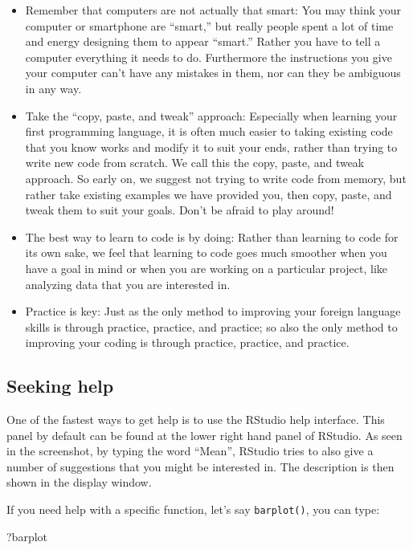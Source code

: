 \documentclass[
]{book}
\newenvironment{Shaded}{\begin{snugshade}}{\end{snugshade}}
\newcommand{\NormalTok}[1]{#1}
\providecommand{\tightlist}{%
  \setlength{\itemsep}{0pt}\setlength{\parskip}{0pt}}
\begin{document}
\begin{itemize}
\tightlist
\item
  Remember that computers are not actually that smart: You may think your computer or smartphone are ``smart,'' but really people spent a lot of time and energy designing them to appear ``smart.'' Rather you have to tell a computer everything it needs to do. Furthermore the instructions you give your computer can't have any mistakes in them, nor can they be ambiguous in any way.
\item
  Take the ``copy, paste, and tweak'' approach: Especially when learning your first programming language, it is often much easier to taking existing code that you know works and modify it to suit your ends, rather than trying to write new code from scratch. We call this the copy, paste, and tweak approach. So early on, we suggest not trying to write code from memory, but rather take existing examples we have provided you, then copy, paste, and tweak them to suit your goals. Don't be afraid to play around!
\item
  The best way to learn to code is by doing: Rather than learning to code for its own sake, we feel that learning to code goes much smoother when you have a goal in mind or when you are working on a particular project, like analyzing data that you are interested in.
\item
  Practice is key: Just as the only method to improving your foreign language skills is through practice, practice, and practice; so also the only method to improving your coding is through practice, practice, and practice.
\end{itemize}

\hypertarget{seeking-help}{%
\subsection*{Seeking help}\label{seeking-help}}

One of the fastest ways to get help is to use the RStudio help interface. This panel by default can be found at the lower right hand panel of RStudio. As seen in the screenshot, by typing the word ``Mean'', RStudio tries to also give a number of suggestions that you might be interested in. The description is then shown in the display window.

If you need help with a specific function, let's say \texttt{barplot()}, you can type:

\begin{Shaded}
\begin{Highlighting}[]
\NormalTok{?barplot}
\end{Highlighting}
\end{Shaded}
\end{document}
